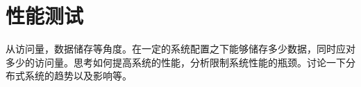 \chapter{性能测试}

从访问量，数据储存等角度。在一定的系统配置之下能够储存多少数据，同时应对多少的访问量。思考如何提高系统的性能，分析限制系统性能的瓶颈。讨论一下分布式系统的趋势以及影响等。